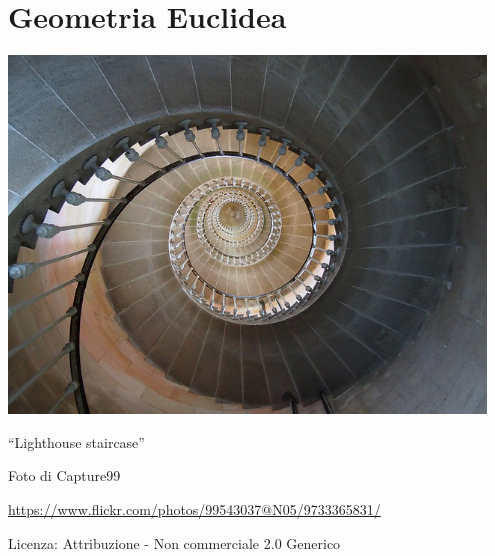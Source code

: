 \part{Geometria Euclidea}

\includegraphics[width=0.95\textwidth]{img/lighthouse.jpg}
  \begin{center}
    {\large ``Lighthouse staircase''}\par
    Foto di Capture99\par
    \url{https://www.flickr.com/photos/99543037@N05/9733365831/}\par
    Licenza: Attribuzione - Non commerciale 2.0 Generico\par
  \end{center}
\clearpage
\cleardoublepage
